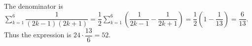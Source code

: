The denominator is $\sum_{k=1}^6\dfrac{1}{(2k-1)(2k+1)}=\dfrac{1}{2}\sum_{k=1}^6\left(\dfrac{1}{2k-1}-\dfrac{1}{2k+1}\right)=\dfrac{1}{2}(1-\dfrac{1}{13})=\dfrac{6}{13}$. Thus the expression is $24\cdot\dfrac{13}{6}=\boxed{52}$.
